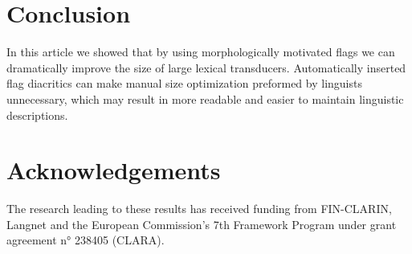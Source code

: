 \documentclass[10pt, a4paper]{article}
\begin{document}

\section{Conclusion}
\label{sec:conclusion}

In this article we showed that by using morphologically motivated
flags we can dramatically improve the size of large lexical transducers. Automatically
inserted flag diacritics can make manual size optimization preformed by
linguists unnecessary, which may result in more readable and easier
to maintain linguistic descriptions.

\section{Acknowledgements}
The research leading to these results has received funding from FIN-CLARIN, Langnet and the
European Commission's 7th Framework Program under grant agreement n° 238405 (CLARA).



\end{document}
